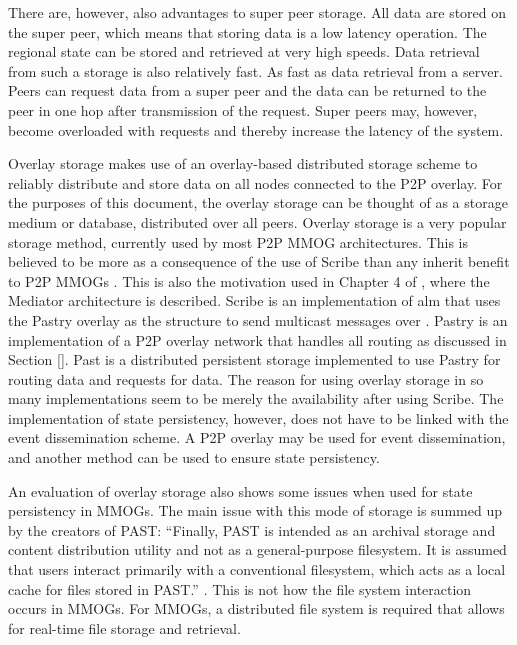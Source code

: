 \documentclass[journal,oneside,a4paper,onecolumn]{IEEEtran}
\begin{document}
There are, however, also advantages to super peer storage. All data are stored on the super peer, which means that storing data is a low latency operation. The regional state can be stored and retrieved at very high speeds. Data retrieval from such a storage is also relatively fast. As fast as data retrieval from a server. Peers can request data from a super peer and the data can be returned to the peer in one hop after transmission of the request. Super peers may, however, become overloaded with requests and thereby increase the latency of the system.

Overlay storage makes use of an overlay-based distributed storage scheme to reliably distribute and store data on all nodes connected to the P2P overlay. For the purposes of this document, the overlay storage can be thought of as a storage medium or database, distributed over all peers.
Overlay storage is a very popular storage method, currently used by most P2P MMOG architectures. This is believed to be more as a consequence of the use of Scribe than any inherit benefit to P2P MMOGs \cite{past_storage_focus}. This is also the motivation used in Chapter 4 of \cite{Fan_phd}, where the Mediator architecture is described. Scribe is an implementation of \ac{alm} that uses the Pastry overlay as the structure to send multicast messages over \cite{scribe}. Pastry is an implementation of a P2P overlay network that handles all routing as discussed in Section \ref{}. Past is a distributed persistent storage implemented to use Pastry for routing data and requests for data. The reason for using overlay storage in so many implementations seem to be merely the availability after using Scribe. The implementation of state persistency, however, does not have to be linked with the event dissemination scheme. A P2P overlay may be used for event dissemination, and another method can be used to ensure state persistency.

An evaluation of overlay storage also shows some issues when used for state persistency in MMOGs. The main issue with this mode of storage is summed up by the creators of PAST: ``Finally, PAST is intended as an archival storage and content distribution utility and not as a general-purpose filesystem. It is assumed that users interact primarily with a conventional filesystem, which acts as a local cache for files stored in PAST.'' \cite{storage_and_chaching_PAST}. This is not how the file system interaction occurs in MMOGs. For MMOGs, a distributed file system is required that allows for real-time file storage and retrieval.
\end{document}
